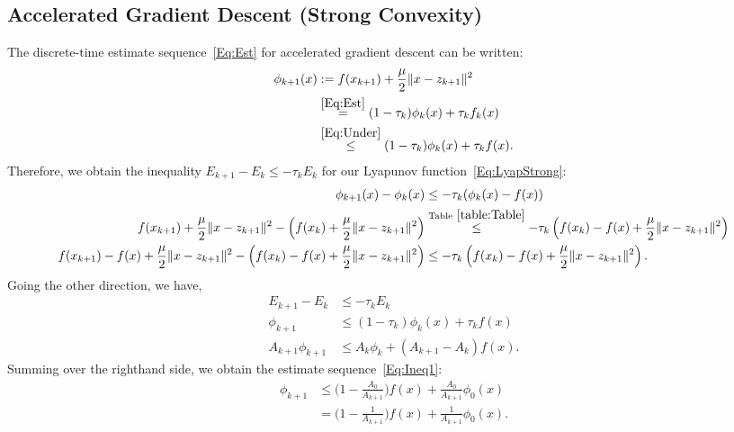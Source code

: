 \documentclass[11pt]{article}
\theoremstyle{plain}
\begin{document}
\subsection{Accelerated Gradient Descent (Strong Convexity)}
The discrete-time estimate sequence~\eqref{Eq:Est} for accelerated gradient descent can be written:
\begin{align*}
\phi_{k+1}(x) &:= f(x_{k+1}) + \frac{\mu}{2}\|x -  z_{k+1}\|^2 \\
& \overset{\eqref{Eq:Est}}{=} (1 - \tau_k) \phi_k(x)  + \tau_k f_k(x) \\
&\overset{\eqref{Eq:Under}}{\leq}(1 - \tau_k) \phi_k(x)  + \tau_k f(x).
\end{align*}
Therefore, we obtain the inequality $E_{k+1} - E_k \leq -\tau_k E_k$ for our Lyapunov function~\eqref{Eq:LyapStrong}:
\begin{align*}
\phi_{k+1}(x) - \phi_k(x) &\leq - \tau_k(\phi_k(x)  -  f(x))\\
f(x_{k+1})  + \frac{\mu}{2}\|x - z_{k+1}\|^2 - \left(f(x_k)   + \frac{\mu}{2}\|x - z_{k+1}\|^2\right) &\overset{\text{Table}~\ref{table:Table}}{\leq} - \tau_k \left(f(x_k) - f(x)  + \frac{\mu}{2}\|x - z_{k+1}\|^2\right)\\ 
f(x_{k+1}) -f(x) + \frac{\mu}{2}\|x - z_{k+1}\|^2 - \left(f(x_k) - f(x)  + \frac{\mu}{2}\|x - z_{k+1}\|^2\right) &\leq - \tau_k \left(f(x_k) - f(x)  + \frac{\mu}{2}\|x - z_{k+1}\|^2\right). 
\end{align*}
Going the other direction, we have, 
\begin{align*}
E_{k+1} - E_k &\leq -\tau_k E_k\\
\phi_{k+1} &\leq (1 - \tau_k) \phi_k(x)  + \tau_k f(x)\\
A_{k+1} \phi_{k+1} &\leq A_k \phi_k + (A_{k+1} - A_k) f(x).
\end{align*}
Summing over the righthand side, we obtain the estimate sequence~\eqref{Eq:Ineq1}: 
\begin{align*}
\phi_{k+1} &\leq \Big(1 -\frac{A_0}{A_{k+1}}\Big) f(x) + \frac{A_0}{A_{k+1}} \phi_0(x)\\
& =  \Big(1 -\frac{1}{A_{k+1}}\Big) f(x) + \frac{1}{A_{k+1}} \phi_0(x).\\
\end{align*}
\end{document}
